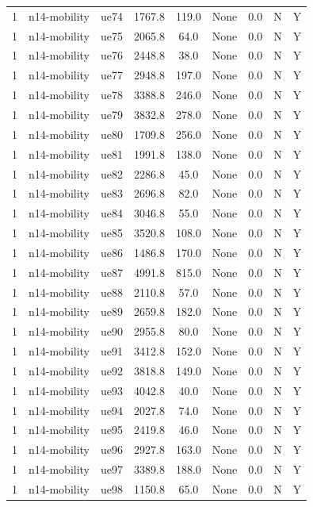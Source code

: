 \begin{table}[ht]
\begin{tabular}{|c|c|c|c|c|c|c|c|c|}
1 & n14-mobility & ue74 & 1767.8 & 119.0 & None & 0.0 & N & Y \\
1 & n14-mobility & ue75 & 2065.8 & 64.0 & None & 0.0 & N & Y \\
1 & n14-mobility & ue76 & 2448.8 & 38.0 & None & 0.0 & N & Y \\
1 & n14-mobility & ue77 & 2948.8 & 197.0 & None & 0.0 & N & Y \\
1 & n14-mobility & ue78 & 3388.8 & 246.0 & None & 0.0 & N & Y \\
1 & n14-mobility & ue79 & 3832.8 & 278.0 & None & 0.0 & N & Y \\
1 & n14-mobility & ue80 & 1709.8 & 256.0 & None & 0.0 & N & Y \\
1 & n14-mobility & ue81 & 1991.8 & 138.0 & None & 0.0 & N & Y \\
1 & n14-mobility & ue82 & 2286.8 & 45.0 & None & 0.0 & N & Y \\
1 & n14-mobility & ue83 & 2696.8 & 82.0 & None & 0.0 & N & Y \\
1 & n14-mobility & ue84 & 3046.8 & 55.0 & None & 0.0 & N & Y \\
1 & n14-mobility & ue85 & 3520.8 & 108.0 & None & 0.0 & N & Y \\
1 & n14-mobility & ue86 & 1486.8 & 170.0 & None & 0.0 & N & Y \\
1 & n14-mobility & ue87 & 4991.8 & 815.0 & None & 0.0 & N & Y \\
1 & n14-mobility & ue88 & 2110.8 & 57.0 & None & 0.0 & N & Y \\
1 & n14-mobility & ue89 & 2659.8 & 182.0 & None & 0.0 & N & Y \\
1 & n14-mobility & ue90 & 2955.8 & 80.0 & None & 0.0 & N & Y \\
1 & n14-mobility & ue91 & 3412.8 & 152.0 & None & 0.0 & N & Y \\
1 & n14-mobility & ue92 & 3818.8 & 149.0 & None & 0.0 & N & Y \\
1 & n14-mobility & ue93 & 4042.8 & 40.0 & None & 0.0 & N & Y \\
1 & n14-mobility & ue94 & 2027.8 & 74.0 & None & 0.0 & N & Y \\
1 & n14-mobility & ue95 & 2419.8 & 46.0 & None & 0.0 & N & Y \\
1 & n14-mobility & ue96 & 2927.8 & 163.0 & None & 0.0 & N & Y \\
1 & n14-mobility & ue97 & 3389.8 & 188.0 & None & 0.0 & N & Y \\
1 & n14-mobility & ue98 & 1150.8 & 65.0 & None & 0.0 & N & Y \\

\end{tabular}
\end{table}
